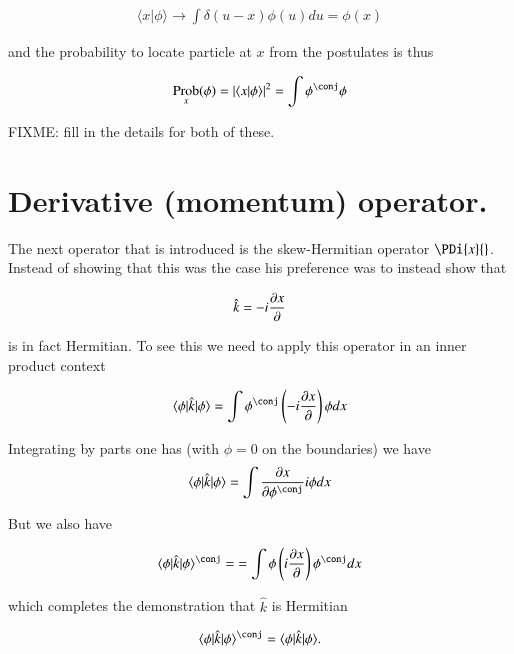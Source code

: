 \documentclass{article}
\newcommand{\ket}[1]{\lvert {#1} \rangle}
\newcommand{\bra}[1]{\langle {#1} \rvert}
\newcommand{\braket}[2]{\langle{#1} \vert {#2}\rangle}
\newcommand{\BraOpKet}[3]{\bra{#1} \hat{#2} \ket{#3} }
\newcommand{\hatk}[0]{\hat{k}}
\DeclareMathOperator{\Prob}{Prob}
\begin{document}
\begin{align*}
\braket{x}{\phi} \rightarrow \int \delta(u-x) \phi(u) du = \phi(x)
\end{align*}

and the probability to locate particle at $x$ from the postulates is thus

\begin{align*}
\Prob_x(\phi) = \Abs{\braket{x}{\phi}}^2 = \int \phi^\conj \phi
\end{align*}

FIXME: fill in the details for both of these.

\section{ Derivative (momentum) operator. }

The next operator that is introduced is the skew-Hermitian operator $\PDi{x}{}$.  Instead of showing that this was the case his preference was
to instead show that 

\begin{align*}
\hatk = - i \PD{x}{}
\end{align*}

is in fact Hermitian.  To see this we need to apply this operator in an inner product context

\begin{align*}
\BraOpKet{\phi}{k}{\phi} 
&= \int \phi^\conj \left( - i \PD{x}{} \right) \phi dx \\
\end{align*}

Integrating by parts one has (with $\phi = 0$ on the boundaries) we have
\begin{align*}
\BraOpKet{\phi}{k}{\phi} 
&= \int \PD{x}{\phi^\conj} i \phi dx \\
\end{align*}

But we also have

\begin{align*}
\BraOpKet{\phi}{k}{\phi}^\conj = 
&= \int \phi\left( i \PD{x}{} \right) \phi^\conj dx \\
\end{align*}

which completes the demonstration that $\hatk$ is Hermitian

\begin{align*}
\BraOpKet{\phi}{k}{\phi}^\conj = \BraOpKet{\phi}{k}{\phi}.
\end{align*}
\end{document}
